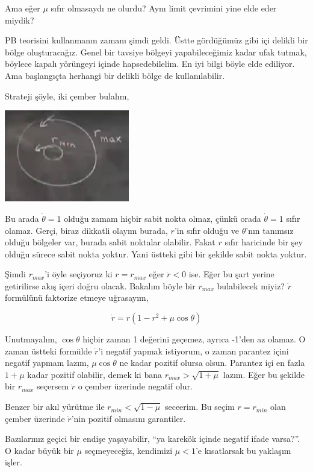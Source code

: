 \documentclass[12pt,fleqn]{article}\usepackage{../../common}
\begin{document}
Ama eğer $\mu$ sıfır olmasaydı ne olurdu? Aynı limit çevrimini yine elde eder
miydik?

PB teorisini kullanmanın zamanı şimdi geldi. Üstte gördüğümüz gibi içi delikli
bir bölge oluşturacağız. Genel bir tavsiye bölgeyi yapabileceğimiz kadar ufak
tutmak, böylece kapalı yörüngeyi içinde hapsedebilelim. En iyi bilgi böyle elde
ediliyor. Ama başlangıçta herhangi bir delikli bölge de kullanılabilir.

Strateji şöyle, iki çember bulalım, 

\includegraphics[height=4cm]{09_11.png}

Bu arada $\dot{\theta}=1$ olduğu zamam hiçbir sabit nokta olmaz, çünkü orada
$\dot{\theta}=1$ sıfır olamaz. Gerçi, biraz dikkatli olayım burada, $r$'in sıfır
olduğu ve $\theta$'nın tanımsız olduğu bölgeler var, burada sabit noktalar
olabilir. Fakat $r$ sıfır haricinde bir şey olduğu sürece sabit nokta
yoktur. Yani üstteki gibi bir şekilde sabit nokta yoktur.

Şimdi $r_{max}$'i öyle seçiyoruz ki $r = r_{max}$ eğer $\dot{r}<0$ ise. Eğer bu
şart yerine getirilirse akış içeri doğru olacak. Bakalım böyle bir $r_{max}$
bulabilecek miyiz? $\dot{r}$ formülünü faktorize etmeye uğrasayım,

$$ \dot{r} = r(1-r^2+\mu \cos\theta) $$

Unutmayalım, $\cos\theta$ hiçbir zaman 1 değerini geçemez, ayrıca -1'den az
olamaz. O zaman üstteki formülde $\dot{r}$'i negatif yapmak istiyorum, o zaman
parantez içini negatif yapmam lazım, $\mu \cos\theta$ ne kadar pozitif olursa
olsun. Parantez içi en fazla $1+\mu$ kadar pozitif olabilir, demek ki bana
$r_{max} > \sqrt{1+\mu}$ lazım. Eğer bu şekilde bir $r_{max}$ seçersem $\dot{r}$
o çember üzerinde negatif olur. 

Benzer bir akıl yürütme ile $r_{min} < \sqrt{1-\mu}$ seceerim. Bu seçim
$r = r_{min}$ olan çember üzerinde $\dot{r}$'nin pozitif olmasını garantiler. 

Bazılarınız geçici bir endişe yaşayabilir, ``ya karekök içinde negatif ifade
varsa?''. O kadar büyük bir $\mu$ seçmeyeceğiz, kendimizi $\mu < 1$'e
kısatlarsak bu yaklaşım işler.
\end{document}
